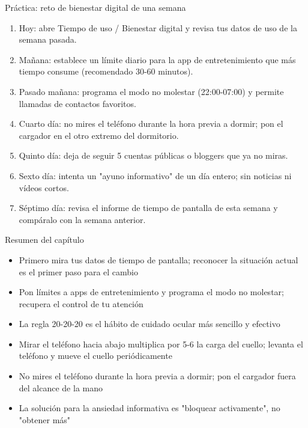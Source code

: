 \begin{tcbpractice}{Práctica: reto de bienestar digital de una semana}
\begin{enumerate}
  \item Hoy: abre Tiempo de uso / Bienestar digital y revisa tus datos de uso de la semana pasada.
  \item Mañana: establece un límite diario para la app de entretenimiento que más tiempo consume (recomendado 30-60 minutos).
  \item Pasado mañana: programa el modo no molestar (22:00-07:00) y permite llamadas de contactos favoritos.
  \item Cuarto día: no mires el teléfono durante la hora previa a dormir; pon el cargador en el otro extremo del dormitorio.
  \item Quinto día: deja de seguir 5 cuentas públicas o bloggers que ya no miras.
  \item Sexto día: intenta un "ayuno informativo" de un día entero; sin noticias ni vídeos cortos.
  \item Séptimo día: revisa el informe de tiempo de pantalla de esta semana y compáralo con la semana anterior.
\end{enumerate}

\end{tcbpractice}

\begin{tcbsummary}{Resumen del capítulo}
\begin{itemize}
  \item Primero mira tus datos de tiempo de pantalla; reconocer la situación actual es el primer paso para el cambio
  \item Pon límites a apps de entretenimiento y programa el modo no molestar; recupera el control de tu atención
  \item La regla 20-20-20 es el hábito de cuidado ocular más sencillo y efectivo
  \item Mirar el teléfono hacia abajo multiplica por 5-6 la carga del cuello; levanta el teléfono y mueve el cuello periódicamente
  \item No mires el teléfono durante la hora previa a dormir; pon el cargador fuera del alcance de la mano
  \item La solución para la ansiedad informativa es "bloquear activamente", no "obtener más"
\end{itemize}

\end{tcbsummary}
